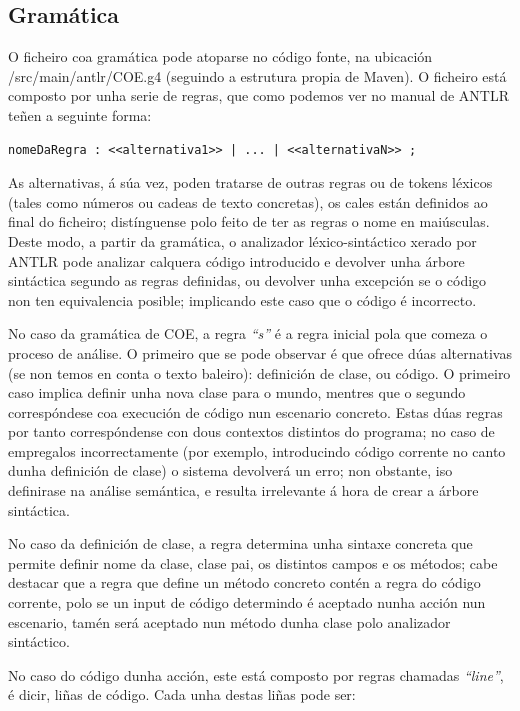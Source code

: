 \subsection{Gramática}
O ficheiro coa gramática pode atoparse no código fonte, na ubicación
/src/main/antlr/COE.g4 (seguindo a estrutura propia de Maven). O ficheiro está
composto por unha serie de regras, que como podemos ver no manual de
ANTLR\cite{antlr4} teñen a seguinte forma:
\begin{lstlisting}
nomeDaRegra : <<alternativa1>> | ... | <<alternativaN>> ;
\end{lstlisting}
\par
As alternativas, á súa vez, poden tratarse de outras regras ou de tokens léxicos
(tales como números ou cadeas de texto concretas), os cales están definidos ao
final do ficheiro; distínguense polo feito de ter as regras o nome en
maiúsculas. Deste modo, a partir da gramática, o analizador léxico-sintáctico
xerado por ANTLR pode analizar calquera código introducido e devolver unha
árbore sintáctica segundo as regras definidas, ou devolver unha excepción se o
código non ten equivalencia posible; implicando este caso que o código é
incorrecto.
\par
No caso da gramática de COE, a regra \textit{``s''} é a regra inicial pola que
comeza o proceso de análise. O primeiro que se pode observar é que ofrece dúas
alternativas (se non temos en conta o texto baleiro): definición de clase, ou
código. O primeiro caso implica definir unha nova clase para o mundo, mentres
que o segundo correspóndese coa execución de código nun escenario concreto.
Estas dúas regras por tanto correspóndense con dous contextos distintos do
programa; no caso de empregalos incorrectamente (por exemplo, introducindo
código corrente no canto dunha definición de clase) o sistema devolverá un erro;
non obstante, iso definirase na análise semántica, e resulta irrelevante á hora
de crear a árbore sintáctica.
\par
No caso da definición de clase, a regra determina unha sintaxe concreta que
permite definir nome da clase, clase pai, os distintos campos e os métodos; cabe
destacar que a regra que define un método concreto contén a regra do código
corrente, polo se un input de código determindo é aceptado nunha acción nun
escenario, tamén será aceptado nun método dunha clase polo analizador
sintáctico.
\par
No caso do código dunha acción, este está composto por regras chamadas
\textit{``line''}, é dicir, liñas de código. Cada unha destas liñas pode ser:
